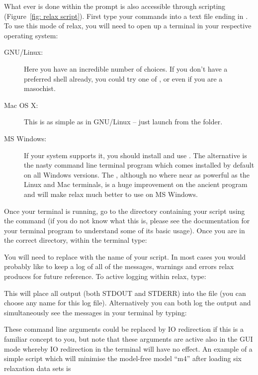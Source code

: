 What ever is done within the prompt is also accessible through scripting (Figure~\ref{fig: relax script}).  First type your commands into a text file ending in .  To use this mode of relax, you will need to open up a terminal in your respective operating system:

\begin{description}
\item[GNU/Linux:]  Here you have an incredible number of choices.  If you don't have a preferred shell already, you could try one of ,  or even  if you are a masochist.
\item[Mac OS X:]  This is as simple as in GNU/Linux -- just launch  from the  folder.
\item[MS Windows:]  If your system supports it, you should install and use .  The alternative is the nasty  command line terminal program which comes installed by default on all Windows versions.  The , although no where near as powerful as the Linux and Mac terminals, is a huge improvement on the ancient  program and will make relax much better to use on MS Windows.
\end{description}

Once your terminal is running, go to the directory containing your script using the  command (if you do not know what this is, please see the documentation for your terminal program to understand some of its basic usage).  Once you are in the correct directory, within the terminal type:


You will need to replace  with the name of your script.  In most cases you would probably like to keep a log of all of the messages, warnings and errors relax produces for future reference.  To active logging within relax, type:


This will place all output (both STDOUT and STDERR) into the  file (you can choose any name for this log file).  Alternatively you can both log the output and simultaneously see the messages in your terminal by typing:


These command line arguments could be replaced by IO redirection if this is a familiar concept to you, but note that these arguments are active also in the GUI mode whereby IO redirection in the terminal will have no effect.   An example of a simple script which will minimise the model-free model ``m4'' after loading six relaxation data sets is

